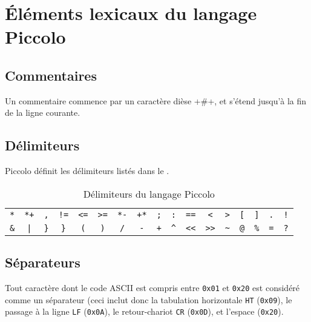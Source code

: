 
\cleardoublepage

\chapter{Éléments lexicaux du langage Piccolo}

\thispagestyle{empty}


\section{Commentaires}

Un commentaire commence par un caractère dièse \pic+#+, et s’étend jusqu’à la fin de la ligne courante.

\section{Délimiteurs}

Piccolo définit les délimiteurs listés dans le .

\begin{table}[!t]
  \centering
  \begin{tabular}{|c|c|c|c|c|c|c|c|c|c|c|c|c|c|c|c|c|}
    \texttt{*}  & \texttt{*+} & \texttt{,}  & \texttt{!=} & \texttt{<=} & \texttt{>=} & \texttt{*-} & \texttt{+*} & \texttt{;} & \texttt{:} & \texttt{==} & \texttt{<} & \texttt{>} & \texttt{[} & \texttt{]} & \texttt{.} & \texttt{!} \\
    \texttt{\&} & \texttt{|}  & \texttt{\}} & \texttt{\}} & \texttt{(}  & \texttt{)}  & \texttt{/}  & \texttt{-} & \texttt{+} & \texttt{\textasciicircum} & \texttt{<{}<} & \texttt{>{}>} & \texttt{\textasciitilde} & \texttt{@} & \texttt{\%} & \texttt{=} & \texttt{?} \\
  \end{tabular}
  \caption{Délimiteurs du langage Piccolo}
  \ligne
\end{table}

\section{Séparateurs}

Tout caractère dont le code ASCII est compris entre \texttt{0x01} et \texttt{0x20} est considéré comme un séparateur (ceci inclut donc la tabulation horizontale \texttt{HT} (\texttt{0x09}), le passage à la ligne \texttt{LF} (\texttt{0x0A}), le retour-chariot \texttt{CR} (\texttt{0x0D}), et l’espace (\texttt{0x20}).

